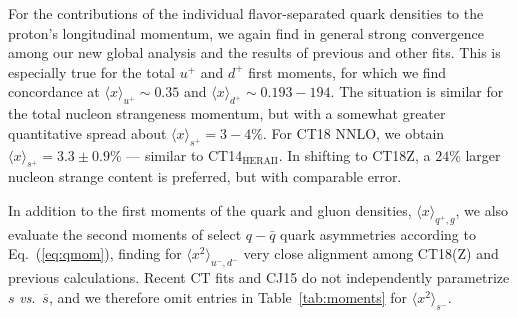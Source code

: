 For the contributions of the individual flavor-separated quark densities to the proton's longitudinal momentum, we again find
in general strong convergence among our new global analysis and the results of previous and other fits. This is especially
true for the total $u^+$ and $d^+$ first moments, for which we find concordance at $\langle x \rangle_{u^+}\! \sim\! 0.35$
and $\langle x \rangle_{d^+}\! \sim\! 0.193\!-\!194$. The situation is similar for the total nucleon strangeness momentum,
but with a somewhat greater quantitative spread about $\langle x \rangle_{s^+}\! =\! 3-4\%$. For CT18 NNLO,
we obtain $\langle x \rangle_{s^+} = 3.3 \pm 0.9\%$ --- similar to CT14$_\mathrm{HERAII}$.
In shifting to CT18Z, a $24\%$ larger nucleon strange content is preferred, but with comparable error.


In addition to the first moments of the quark and gluon densities, $\langle x \rangle_{q^+,g}$, we also evaluate
the second moments of select $q-\bar{q}$ quark asymmetries according to Eq.~(\ref{eq:qmom}), finding for $\langle x^2 \rangle_{u^-,d^-}$
very close alignment among CT18(Z) and previous calculations. Recent CT fits and CJ15 do not independently parametrize $s$ {\it vs}.~$\overline{s}$,
and we therefore omit entries in Table~\ref{tab:moments} for $\langle x^2 \rangle_{s^-}$.


